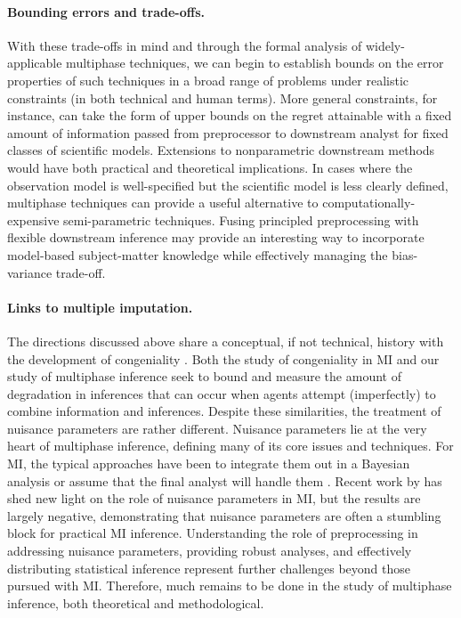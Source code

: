 \paragraph{Bounding errors and trade-offs.}
With these trade-offs in mind and through the formal analysis of widely-applicable multiphase techniques, we can begin to establish bounds on the error properties of such techniques in a broad range of problems under realistic constraints (in both technical and human terms).
More general constraints, for instance, can take the form of upper bounds on the regret attainable with a fixed amount of information passed from preprocessor to downstream analyst for fixed classes of scientific models.
Extensions to nonparametric downstream methods would have both practical and theoretical implications.
In cases where the observation model is well-specified but the scientific model is less clearly defined, multiphase techniques can provide a useful alternative to computationally-expensive semi-parametric techniques.
Fusing principled preprocessing with flexible downstream inference may provide an interesting way to incorporate model-based subject-matter knowledge while effectively managing the bias-variance trade-off.

\paragraph{Links to multiple imputation.}
The directions discussed above share a conceptual, if not technical, history with the development of congeniality \citep{Meng1994}.
Both the study of congeniality in MI and our study of multiphase inference seek to bound and measure the amount of degradation in inferences that can occur when agents attempt (imperfectly) to combine information and inferences.
Despite these similarities, the treatment of nuisance parameters are rather different.
Nuisance parameters lie at the very heart of multiphase inference, defining many of its core issues and techniques.
For MI, the typical approaches have been to integrate them out in a Bayesian analysis \citep[e.g.,][]{Rubin1996} or assume that the final analyst will handle them \citep[e.g.,][]{Nielsen2003}.
Recent work by \cite{Xie2012} has shed new light on the role of nuisance parameters in MI, but the results are largely negative, demonstrating that nuisance parameters are often a stumbling block for practical MI inference.
Understanding the role of preprocessing in addressing nuisance parameters, providing robust analyses, and effectively distributing statistical inference represent further challenges beyond those pursued with MI.
Therefore, much remains to be done in  the study of multiphase inference, both theoretical and methodological.

